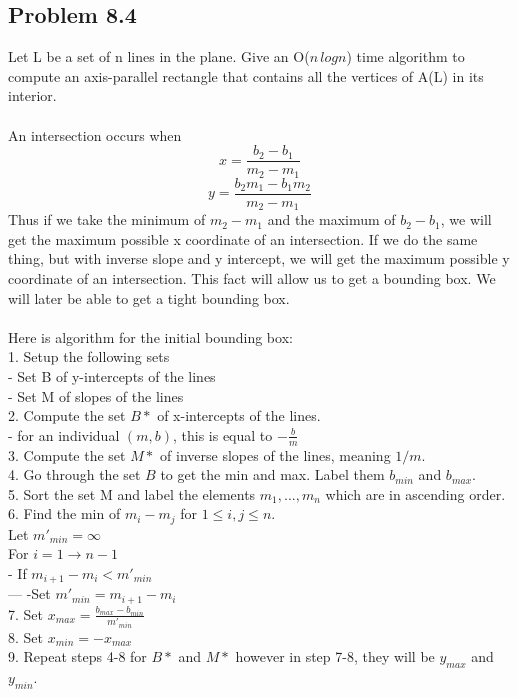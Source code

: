 \documentclass[11pt,psfig]{article}
\begin{document}
\subsection*{Problem 8.4}

Let L be a set of n lines in the plane. Give an O($n \, logn$) time algorithm to
compute an axis-parallel rectangle that contains all the vertices of A(L)
in its interior.
\\
\\
An intersection occurs when 
\[
x = \frac{b_2-b_1}{m_2-m_1}
\]
\[
y = \frac{b_2m_1 - b_1m_2}{m_2-m_1}
\]
Thus if we take the minimum of $m_2-m_1$ and the maximum of $b_2-b_1$, we will get the maximum possible x coordinate of an intersection. If we do the same thing, but with inverse slope and y intercept, we will get the maximum possible y coordinate of an intersection. This fact will allow us to get a bounding box. We will later be able to get a tight bounding box.\\
\\
Here is algorithm for the initial bounding box:\\
1. Setup the following sets\\
		- Set B of y-intercepts of the lines\\
		- Set M of slopes of the lines\\
2. Compute the set $B*$ of x-intercepts of the lines. \\
			- for an individual $(m,b)$, this is equal to $-\frac{b}{m}$\\
3. Compute the set $M*$ of inverse slopes of the lines, meaning $1/m$. \\
4. Go through the set $B$ to get the min and max. Label them $b_{min}$ and $b_{max}$.\\
5. Sort the set M and label the elements $m_1,...,m_n$ which are in ascending order. \\
6. Find the min of $m_i - m_j$ for $1 \leq i,j \leq n$. \\
		Let $m'_{min} = \infty$\\
		For $i = 1\rightarrow n-1$\\
		- If $m_{i+1} - m_i < m'_{min}$ \\
		---    -Set $m'_{min} = m_{i+1}-m_i$\\
7. Set $x_{max} = \frac{b_{max}-b_{min}}{m'_{min}}$\\
8. Set $x_{min} = -x_{max}$\\
9. Repeat steps 4-8 for $B*$ and $M*$ however in step 7-8, they will be $y_{max}$ and $y_{min}$. \\
\end{document}
